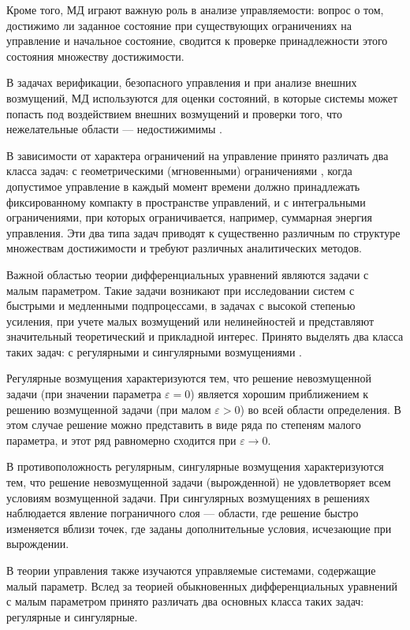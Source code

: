 \documentclass[../main.tex]{subfiles}
\begin{document}
Кроме того, МД играют важную роль в анализе управляемости: вопрос о том, достижимо ли заданное состояние при существующих ограничениях на управление и начальное состояние, сводится к проверке принадлежности этого состояния множеству достижимости\cite{Kur1, Kurzhanski1977}.

В задачах верификации, безопасного управления и при анализе внешних возмущений, МД используются для оценки состояний, в которые системы может попасть под воздействием внешних возмущений и проверки того, что нежелательные области --- недостижимимы \cite{Mitchell, Filippova2015}. 

В зависимости от характера ограничений на управление принято различать два класса задач: с геометрическими (мгновенными) ограничениями \cite{Pontryagin1961, Kurzhanski1977}, когда допустимое управление в каждый момент времени должно принадлежать фиксированному компакту в пространстве управлений, и с интегральными ограничениями\cite{Kur1, Guseinov2007, Guseinov2009, Guseinov2010, GusZyk}, при которых ограничивается, например, суммарная энергия управления. 
Эти два типа задач приводят к существенно различным по структуре множествам достижимости и требуют различных аналитических методов.

Важной областью теории дифференциальных уравнений являются задачи с малым параметром.
Такие задачи возникают при исследовании систем с быстрыми и медленными подпроцессами, в задачах с высокой степенью усиления, при учете малых возмущений или нелинейностей и представляют значительный теоретический и прикладной интерес. 
Принято выделять два класса таких задач: с регулярными и сингулярными возмущениями  \cite{Tihonov1948,Tihonov1952}.

Регулярные возмущения характеризуются тем, что решение невозмущенной задачи (при значении параметра $\varepsilon = 0$) является хорошим приближением к решению возмущенной задачи (при малом $\varepsilon > 0$) во всей области определения. 
В этом случае решение можно представить в виде ряда по степеням малого параметра, и этот ряд равномерно сходится при $\varepsilon \to 0$.

В противоположность регулярным, сингулярные возмущения характеризуются тем, что решение невозмущенной задачи (вырожденной) не удовлетворяет всем условиям возмущенной задачи. 
При сингулярных возмущениях в решениях наблюдается явление пограничного слоя --- области, где решение быстро изменяется вблизи точек, где заданы дополнительные условия, исчезающие при вырождении.

В теории управления также изучаются управляемые системами, содержащие малый параметр.  Вслед за теорией обыкновенных дифференциальных уравнений с малым параметром принято различать два основных класса таких задач: регулярные и сингулярные. 
\end{document}
